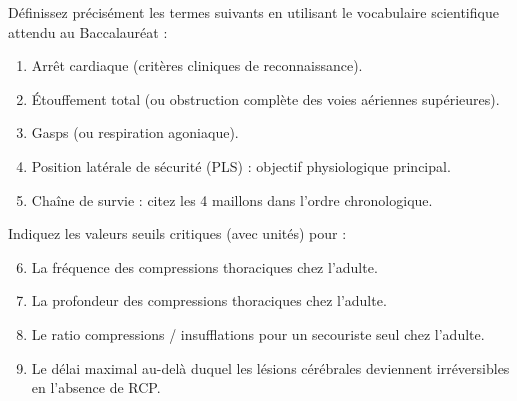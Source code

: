 \documentclass[11pt]{article}
\begin{document}
\begin{exercice}
Définissez précisément les termes suivants en utilisant le vocabulaire scientifique attendu au Baccalauréat :
\begin{enumerate}
    \item Arrêt cardiaque (critères cliniques de reconnaissance).
    \item Étouffement total (ou obstruction complète des voies aériennes supérieures).
    \item Gasps (ou respiration agoniaque).
    \item Position latérale de sécurité (PLS) : objectif physiologique principal.
    \item Chaîne de survie : citez les 4 maillons dans l'ordre chronologique.
\end{enumerate}
Indiquez les valeurs seuils critiques (avec unités) pour :
\begin{enumerate}
    \setcounter{enumi}{5}
    \item La fréquence des compressions thoraciques chez l'adulte.
    \item La profondeur des compressions thoraciques chez l'adulte.
    \item Le ratio compressions / insufflations pour un secouriste seul chez l'adulte.
    \item Le délai maximal au-delà duquel les lésions cérébrales deviennent irréversibles en l'absence de RCP.
\end{enumerate}
\end{exercice}
\end{document}
